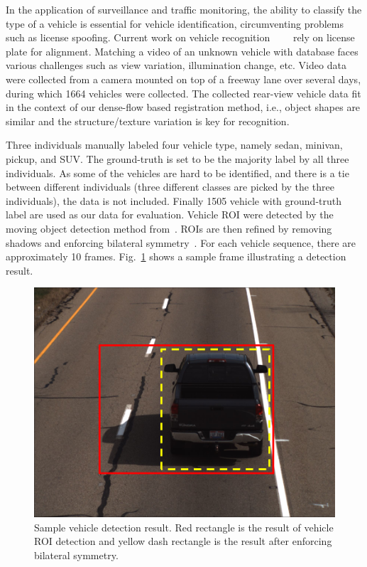 \documentclass[10pt,journal]{IEEEtran}
\begin{document}
In the application of surveillance and traffic monitoring, the ability to classify the type of a vehicle is essential for vehicle identification, circumventing problems such as license spoofing. Current work on vehicle recognition~\cite{Petrovic04}~\cite{Negri06}~\cite{Zafar09}~\cite{Pearce11} rely on license plate for alignment. Matching a video of an unknown vehicle with database faces various challenges such as view variation, illumination change, etc. Video data were collected from a camera mounted on top of a freeway lane over several days, during which 1664 vehicles were collected. The collected rear-view vehicle data fit in the context of our dense-flow based registration method, i.e., object shapes are similar and the structure/texture variation is key for recognition. 

Three individuals manually labeled four vehicle type, namely sedan, minivan, pickup, and SUV. The ground-truth is set to be the majority label by all three individuals. As some of the vehicles are hard to be identified, and there is a tie between different individuals (three different classes are picked by the three individuals), the data is not included. Finally 1505 vehicle with ground-truth label are used as our data for evaluation. Vehicle ROI were detected by the moving object detection method from~\cite{Thakoor05}. ROIs are then refined by removing shadows and enforcing bilateral symmetry~\cite{Thakoor13}. For each vehicle sequence, there are approximately 10 frames. Fig.~\ref{fig:vehicle_raw_data} shows a sample frame illustrating a detection result.  

\begin{figure}[htbp]
	\centering
		\includegraphics[width=.9\columnwidth]{fig/vehicle_raw_data.png}
	\caption{Sample vehicle detection result. Red rectangle is the result of vehicle ROI detection and yellow dash rectangle is the result after enforcing bilateral symmetry.}
	\label{fig:vehicle_raw_data}
\end{figure}
\end{document}
